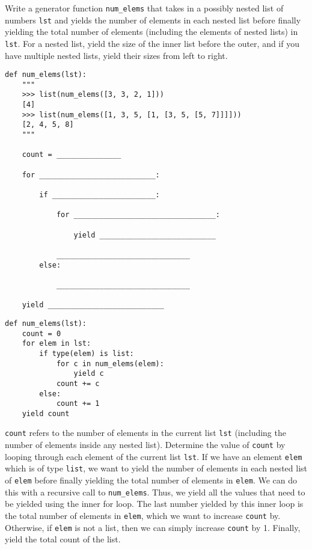 \question
Write a generator function \lstinline{num_elems} that takes in a possibly nested list of numbers \lstinline{lst} and yields the number of elements in each nested list before finally yielding the total number of elements (including the elements of nested lists) in \lstinline{lst}. For a nested list, yield the size of the inner list before the outer, and if you have multiple nested lists, yield their sizes from left to right.

\begin{lstlisting}
def num_elems(lst):
    """
    >>> list(num_elems([3, 3, 2, 1]))
    [4]
    >>> list(num_elems([1, 3, 5, [1, [3, 5, [5, 7]]]]))
    [2, 4, 5, 8]
    """

    count = _______________

    for ___________________________:

        if ________________________:

            for _________________________________:

                yield ___________________________

            _______________________________
        else:

            _______________________________

    yield ___________________________
\end{lstlisting} 
\begin{solution}
\begin{lstlisting}
def num_elems(lst):
    count = 0
    for elem in lst:
        if type(elem) is list:
            for c in num_elems(elem):
                yield c
            count += c
        else:
            count += 1
    yield count
\end{lstlisting}

\lstinline{count} refers to the number of elements in the current list \lstinline{lst} (including the number of elements inside any nested list). Determine the value of \lstinline{count} by looping through each element of the current list \lstinline{lst}. If we have an element \lstinline{elem} which is of type \lstinline{list}, we want to yield the number of elements in each nested list of \lstinline{elem} before finally yielding the total number of elements in \lstinline{elem}. We can do this with a recursive call to \lstinline{num_elems}. Thus, we yield all the values that need to be yielded using the inner for loop. The last number yielded by this inner loop is the total number of elements in \lstinline{elem}, which we want to increase \lstinline{count} by. Otherwise, if \lstinline{elem} is not a list, then we can simply increase \lstinline{count} by 1. Finally, yield the total count of the list.
\end{solution}
